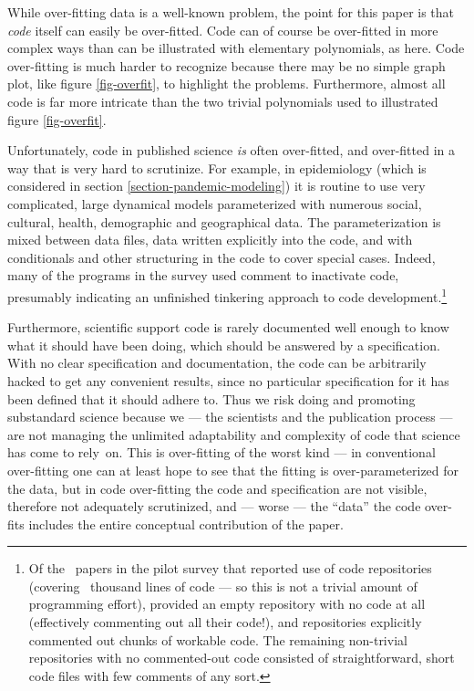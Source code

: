 \documentclass[11pt]{article}
\begin{document}
While over-fitting data is a well-known problem, the point for this paper is that \emph{code\/} itself can easily be over-fitted. Code can of course be over-fitted in more complex ways than can be illustrated with elementary polynomials, as here. Code over-fitting is much harder to recognize because there may be no simple graph plot, like figure \ref{fig-overfit}, to highlight the problems. Furthermore, almost all code is far more intricate than the two trivial polynomials used to illustrated figure \ref{fig-overfit}. 

Unfortunately, code in published science \emph{is\/} often over-fitted, and over-fitted in a way that is very hard to scrutinize. For example, in epidemiology (which is considered in section \ref{section-pandemic-modeling}) it is routine to use very complicated, large dynamical models parameterized with numerous social, cultural, health, demographic and geographical data. The parameterization is mixed between data files, data written explicitly into the code, and with conditionals and other structuring in the code to cover special cases. Indeed, many of the programs in the survey used comment to inactivate code, presumably indicating an unfinished tinkering approach to code development.\footnote{Of the \the\countRepos\ papers in the pilot survey that reported use of code repositories (covering 
\totalkLOC\ thousand lines of code --- so this is not a trivial amount of programming effort), \numbertoname{\the\countMissingCode} provided an empty repository with no code at all (effectively commenting out all their code!), and \numbertoname{\the\countCommentedOut} repositories explicitly commented out chunks of workable code. The \numbertoname{\the\countNotCommentedOut} remaining non-trivial repositories with no commented-out code consisted of straightforward, short code files with few comments of any sort.}

Furthermore, scientific support code is rarely documented well enough to know what it should have been doing, which should be answered by a specification. With no clear specification and documentation, the code can be arbitrarily hacked to get any convenient results, since no particular specification for it has been defined that it should adhere to. Thus we risk doing and promoting substandard science because we --- the scientists and the publication process --- are not managing the unlimited adaptability and complexity of code that science has come to rely~on. This is over-fitting of the worst kind --- in conventional over-fitting one can at least hope to see that the fitting is over-parameterized for the data, but in code over-fitting the code and specification are not visible, therefore not adequately scrutinized, and --- worse --- the ``data'' the code over-fits includes the entire conceptual contribution of the paper. 
\end{document}
